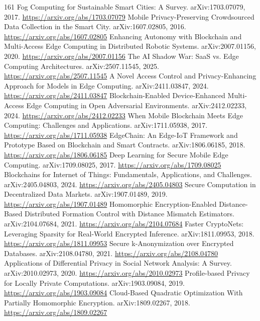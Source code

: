 \documentclass[11pt]{article}
\begin{document}
\begin{thebibliography}{161}
 Fog Computing for Sustainable Smart Cities: A Survey. arXiv:1703.07079, 2017. \url{https://arxiv.org/abs/1703.07079}
 Mobile Privacy-Preserving Crowdsourced Data Collection in the Smart City. arXiv:1607.02805, 2016. \url{https://arxiv.org/abs/1607.02805}
 Enhancing Autonomy with Blockchain and Multi-Access Edge Computing in Distributed Robotic Systems. arXiv:2007.01156, 2020. \url{https://arxiv.org/abs/2007.01156}
 The AI Shadow War: SaaS vs. Edge Computing Architectures. arXiv:2507.11545, 2025. \url{https://arxiv.org/abs/2507.11545}
 A Novel Access Control and Privacy-Enhancing Approach for Models in Edge Computing. arXiv:2411.03847, 2024. \url{https://arxiv.org/abs/2411.03847}
 Blockchain-Enabled Device-Enhanced Multi-Access Edge Computing in Open Adversarial Environments. arXiv:2412.02233, 2024. \url{https://arxiv.org/abs/2412.02233}
 When Mobile Blockchain Meets Edge Computing: Challenges and Applications. arXiv:1711.05938, 2017. \url{https://arxiv.org/abs/1711.05938}
 EdgeChain: An Edge-IoT Framework and Prototype Based on Blockchain and Smart Contracts. arXiv:1806.06185, 2018. \url{https://arxiv.org/abs/1806.06185}
 Deep Learning for Secure Mobile Edge Computing. arXiv:1709.08025, 2017. \url{https://arxiv.org/abs/1709.08025}
 Blockchains for Internet of Things: Fundamentals, Applications, and Challenges. arXiv:2405.04803, 2024. \url{https://arxiv.org/abs/2405.04803}
 Secure Computation in Decentralized Data Markets. arXiv:1907.01489, 2019. \url{https://arxiv.org/abs/1907.01489}
 Homomorphic Encryption-Enabled Distance-Based Distributed Formation Control with Distance Mismatch Estimators. arXiv:2104.07684, 2021. \url{https://arxiv.org/abs/2104.07684}
 Faster CryptoNets: Leveraging Sparsity for Real-World Encrypted Inference. arXiv:1811.09953, 2018. \url{https://arxiv.org/abs/1811.09953}
 Secure k-Anonymization over Encrypted Databases. arXiv:2108.04780, 2021. \url{https://arxiv.org/abs/2108.04780}
 Applications of Differential Privacy in Social Network Analysis: A Survey. arXiv:2010.02973, 2020. \url{https://arxiv.org/abs/2010.02973}
 Profile-based Privacy for Locally Private Computations. arXiv:1903.09084, 2019. \url{https://arxiv.org/abs/1903.09084}
 Cloud-Based Quadratic Optimization With Partially Homomorphic Encryption. arXiv:1809.02267, 2018. \url{https://arxiv.org/abs/1809.02267}

\end{thebibliography}
\end{document}
